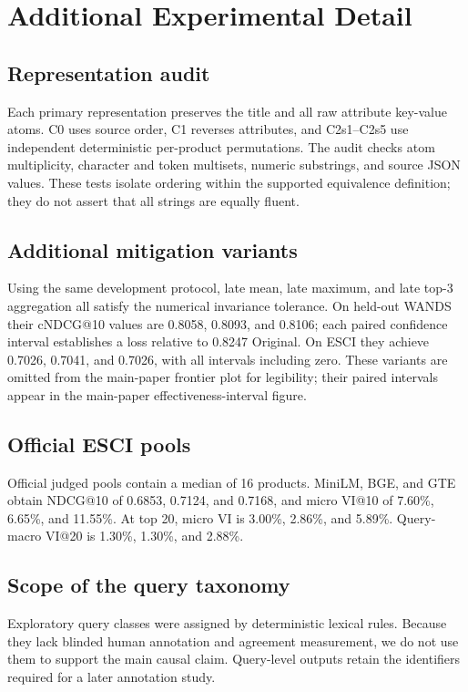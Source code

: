 \section{Additional Experimental Detail}

\subsection{Representation audit}
Each primary representation preserves the title and all raw attribute key-value atoms. C0 uses source order, C1 reverses attributes, and C2s1--C2s5 use independent deterministic per-product permutations. The audit checks atom multiplicity, character and token multisets, numeric substrings, and source JSON values. These tests isolate ordering within the supported equivalence definition; they do not assert that all strings are equally fluent.

\subsection{Additional mitigation variants}
\label{app:mitigations}
Using the same development protocol, late mean, late maximum, and late top-3 aggregation all satisfy the numerical invariance tolerance. On held-out WANDS their cNDCG@10 values are 0.8058, 0.8093, and 0.8106; each paired confidence interval establishes a loss relative to 0.8247 Original. On ESCI they achieve 0.7026, 0.7041, and 0.7026, with all intervals including zero. These variants are omitted from the main-paper frontier plot for legibility; their paired intervals appear in the main-paper effectiveness-interval figure.

\subsection{Official ESCI pools}
Official judged pools contain a median of 16 products. MiniLM, BGE, and GTE obtain NDCG@10 of 0.6853, 0.7124, and 0.7168, and micro VI@10 of 7.60\%, 6.65\%, and 11.55\%. At top 20, micro VI is 3.00\%, 2.86\%, and 5.89\%. Query-macro VI@20 is 1.30\%, 1.30\%, and 2.88\%.

\subsection{Scope of the query taxonomy}
Exploratory query classes were assigned by deterministic lexical rules. Because they lack blinded human annotation and agreement measurement, we do not use them to support the main causal claim. Query-level outputs retain the identifiers required for a later annotation study.

